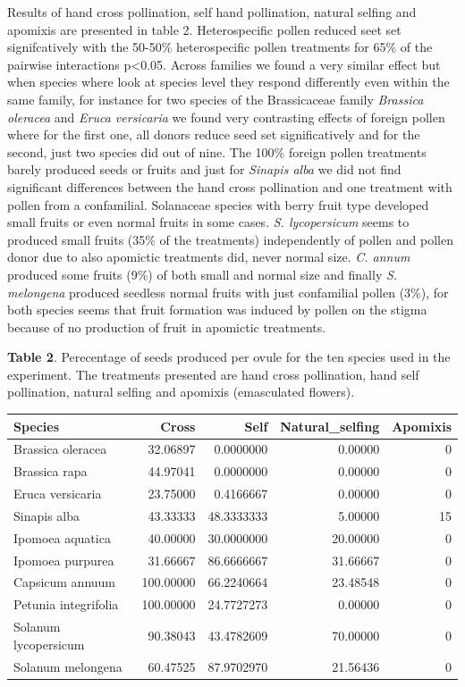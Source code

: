 \documentclass[11pt,a4paper]{article}
\begin{document}
Results of hand cross pollination, self hand pollination, natural
selfing and apomixis are presented in table 2. Heterospecific pollen
reduced seet set signifcatively with the 50-50\% heterospecific pollen
treatments for 65\% of the pairwise interactions p\textless{}0.05.
Across families we found a very similar effect but when species where
look at species level they respond differently even within the same
family, for instance for two species of the Brassicaceae family
\emph{Brassica oleracea} and \emph{Eruca versicaria} we found very
contrasting effects of foreign pollen where for the first one, all
donors reduce seed set significatively and for the second, just two
species did out of nine. The 100\% foreign pollen treatments barely
produced seeds or fruits and just for \emph{Sinapis alba} we did not
find significant differences between the hand cross pollination and one
treatment with pollen from a confamilial. Solanaceae species with berry
fruit type developed small fruits or even normal fruits in some cases.
\emph{S. lycopersicum} seems to produced small fruits (35\% of the
treatments) independently of pollen and pollen donor due to also
apomictic treatments did, never normal size. \emph{C. annum} produced
some fruits (9\%) of both small and normal size and finally \emph{S.
melongena} produced seedless normal fruits with just confamilial pollen
(3\%), for both species seems that fruit formation was induced by pollen
on the stigma because of no production of fruit in apomictic treatments.

\textbf{Table 2}. Perecentage of seeds produced per ovule for the ten
species used in the experiment. The treatments presented are hand cross
pollination, hand self pollination, natural selfing and apomixis
(emasculated flowers).

\begin{longtable}[]{@{}lrrrr@{}}
\toprule
Species & Cross & Self & Natural\_selfing & Apomixis\tabularnewline
\midrule
\endhead
Brassica oleracea & 32.06897 & 0.0000000 & 0.00000 & 0\tabularnewline
Brassica rapa & 44.97041 & 0.0000000 & 0.00000 & 0\tabularnewline
Eruca versicaria & 23.75000 & 0.4166667 & 0.00000 & 0\tabularnewline
Sinapis alba & 43.33333 & 48.3333333 & 5.00000 & 15\tabularnewline
Ipomoea aquatica & 40.00000 & 30.0000000 & 20.00000 & 0\tabularnewline
Ipomoea purpurea & 31.66667 & 86.6666667 & 31.66667 & 0\tabularnewline
Capsicum annuum & 100.00000 & 66.2240664 & 23.48548 & 0\tabularnewline
Petunia integrifolia & 100.00000 & 24.7727273 & 0.00000 &
0\tabularnewline
Solanum lycopersicum & 90.38043 & 43.4782609 & 70.00000 &
0\tabularnewline
Solanum melongena & 60.47525 & 87.9702970 & 21.56436 & 0\tabularnewline
\bottomrule
\end{longtable}
\end{document}
